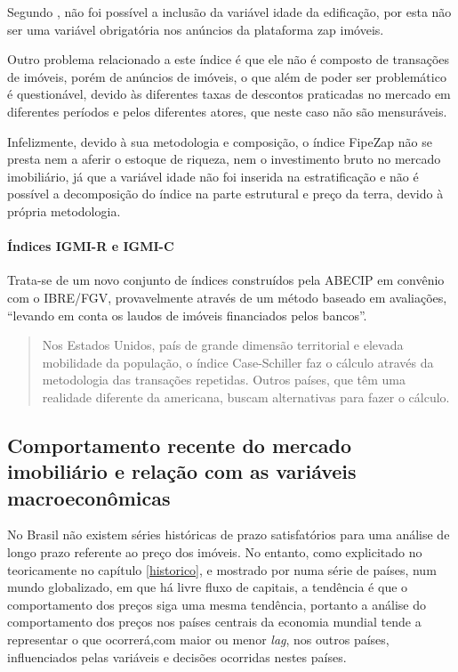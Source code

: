 \documentclass[
	12pt,				%
	oneside,			%
	a4paper,			%
	chapter=TITLE,		%
	section=TITLE,		%
	english,			%
	brazil				%
	]{abntex2}
\begin{document}
Segundo \textcite{fipezap}, não foi possível a inclusão da variável
idade da edificação, por esta não ser uma variável obrigatória nos
anúncios da plataforma zap imóveis.

Outro problema relacionado a este índice é que ele não é composto de
transações de imóveis, porém de anúncios de imóveis, o que além de poder
ser problemático é questionável, devido às diferentes taxas de descontos
praticadas no mercado em diferentes períodos e pelos diferentes atores,
que neste caso não são mensuráveis.

Infelizmente, devido à sua metodologia e composição, o índice FipeZap
não se presta nem a aferir o estoque de riqueza, nem o investimento
bruto no mercado imobiliário, já que a variável idade não foi inserida
na estratificação e não é possível a decomposição do índice na parte
estrutural e preço da terra, devido à própria metodologia.

\paragraph{Índices IGMI-R e IGMI-C}\label{uxedndices-igmi-r-e-igmi-c}

Trata-se de um novo conjunto de índices construídos pela \gls{ABECIP} em
convênio com o \gls{IBRE}/\gls{FGV}, provavelmente através de um método
baseado em avaliações, ``levando em conta os laudos de imóveis
financiados pelos bancos''.
\begin{quote}
Nos Estados Unidos, país de grande dimensão territorial e elevada
mobilidade da população, o índice Case-Schiller faz o cálculo através da
metodologia das transações repetidas. Outros países, que têm uma
realidade diferente da americana, buscam alternativas para fazer o
cálculo.
\end{quote}
\subsection{Comportamento recente do mercado imobiliário e relação com
as variáveis
macroeconômicas}\label{comportamento-recente-do-mercado-imobiliuxe1rio-e-relauxe7uxe3o-com-as-variuxe1veis-macroeconuxf4micas}

No Brasil não existem séries históricas de prazo satisfatórios para uma
análise de longo prazo referente ao preço dos imóveis. No entanto, como
explicitado no teoricamente no capítulo \ref{historico}, e mostrado por
\textcite{ADAMS201038} numa série de países, num mundo globalizado, em
que há livre fluxo de capitais, a tendência é que o comportamento dos
preços siga uma mesma tendência, portanto a análise do comportamento dos
preços nos países centrais da economia mundial tende a representar o que
ocorrerá,com maior ou menor \emph{lag}, nos outros países, influenciados
pelas variáveis e decisões ocorridas nestes países.
\end{document}
